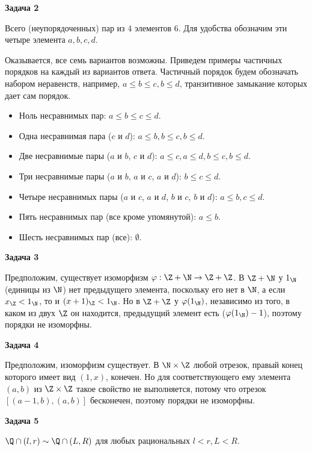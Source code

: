 	\begin{center}
    \textbf{Задача 2}
\end{center}
		Всего (неупорядоченных) пар из $4$ элементов $6$. Для удобства обозначим эти четыре элемента $a, b, c, d$.

		Оказывается, все семь вариантов возможны. Приведем примеры частичных порядков на каждый из вариантов ответа. Частичный порядок будем обозначать набором неравенств, например, $a \le b \le c, b \le d$, транзитивное замыкание которых дает сам порядок.

		\begin{itemize}
			\item Ноль несравнимых пар: $a \le b \le c \le d$.
			\item Одна несравнимая пара ($c$ и $d$): $a \le b, b \le c, b \le d$.
			\item Две несравнимые пары ($a$ и $b$, $c$ и $d$): $a \le c, a \le d, b \le c, b \le d$.
			\item Три несравнимые пары ($a$ и $b$, $a$ и $c$, $a$ и $d$): $b \le c \le d$.
			\item Четыре несравнимых пары ($a$ и $c$, $a$ и $d$, $b$ и $c$, $b$ и $d$): $a \le b, c \le d$.
			\item Пять несравнимых пар (все кроме упомянутой): $a \le b$.
			\item Шесть несравнимых пар (все): $\emptyset$.
		\end{itemize}


	\begin{center}
    \textbf{Задача 3}
\end{center}
		Предположим, существует изоморфизм $\varphi: \Z + \N \to \Z + \Z$. В $\Z + \N$ у $1_{\N}$ (единицы из $\N$) нет предыдущего элемента, поскольку его нет в $\N$, а если $x_{\Z} < 1_{\N}$, то и $(x+1)_{\Z} < 1_{\N}$. Но в $\Z + \Z$ у $\varphi(1_{\N})$, независимо из того, в каком из двух $\Z$ он находится, предыдущий элемент есть ($\varphi(1_{\N}) - 1$), поэтому порядки не изоморфны.


	\begin{center}
    \textbf{Задача 4}
\end{center}
		Предположим, изоморфизм существует. В $\N \times \Z$ любой отрезок, правый конец которого имеет вид $(1, x)$, конечен. Но для соответствующего ему элемента $(a, b)$ из $\Z \times \Z$ такое свойство не выполняется, потому что отрезок $[(a - 1, b), (a, b)]$ бесконечен, поэтому порядки не изоморфны.


	\begin{center}
    \textbf{Задача 5}
\end{center}
		\begin{lemma}
			$\Q \cap (l, r) \sim \Q \cap (L, R)$ для любых рациональных $l < r, L < R$.
		\end{lemma}

